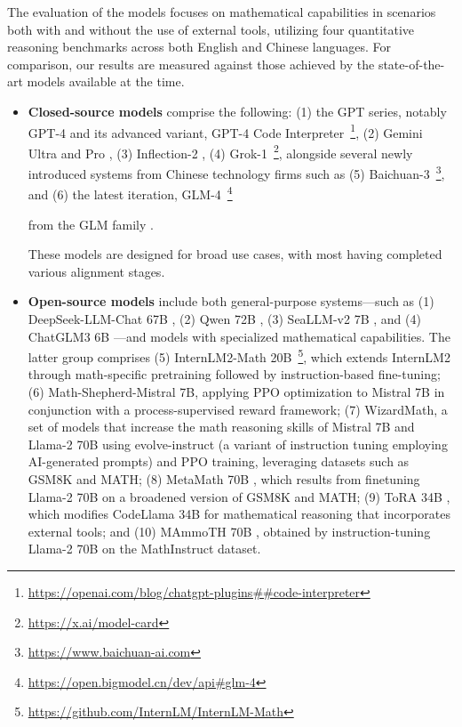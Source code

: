 \begin{itemize}[topsep=0pt]
The evaluation of the models focuses on mathematical capabilities in scenarios both with and without the use of external tools, utilizing four quantitative reasoning benchmarks across both English and Chinese languages. For comparison, our results are measured against those achieved by the state-of-the-art models available at the time.

\begin{itemize}[topsep=0pt]
    \item \textbf{Closed-source models} comprise the following: (1) the GPT series, notably GPT-4 \citep{gpt4} and its advanced variant, GPT-4 Code Interpreter~\footnote{\url{https://openai.com/blog/chatgpt-plugins\#\#code-interpreter}}, (2) Gemini Ultra and Pro \citep{gemini}, (3) Inflection-2 \citep{inflection-2}, (4) Grok-1~\footnote{\url{https://x.ai/model-card}}, alongside several newly introduced systems from Chinese technology firms such as (5) Baichuan-3~\footnote{\url{https://www.baichuan-ai.com}}, and (6) the latest iteration, GLM-4~\footnote{\url{https://open.bigmodel.cn/dev/api\#glm-4}}

    from the GLM family \citep{glm}.

These models are designed for broad use cases, with most having completed various alignment stages.

\item \textbf{Open-source models} include both general-purpose systems—such as (1) DeepSeek-LLM-Chat 67B \citep{deepseek-llm}, (2) Qwen 72B \citep{qwen}, (3) SeaLLM-v2 7B \citep{seallm}, and (4) ChatGLM3 6B \citep{chatglm3}—and models with specialized mathematical capabilities. The latter group comprises (5) InternLM2-Math 20B~\footnote{\url{https://github.com/InternLM/InternLM-Math}}, which extends InternLM2 through math-specific pretraining followed by instruction-based fine-tuning; (6) Math-Shepherd-Mistral 7B, applying PPO optimization \citep{schulman2017proximal} to Mistral 7B \citep{mistral} in conjunction with a process-supervised reward framework; (7) WizardMath, a set of models that increase the math reasoning skills of Mistral 7B and Llama-2 70B \citep{llama2} using evolve-instruct (a variant of instruction tuning employing AI-generated prompts) and PPO training, leveraging datasets such as GSM8K and MATH; (8) MetaMath 70B \citep{metamath}, which results from finetuning Llama-2 70B on a broadened version of GSM8K and MATH; (9) ToRA 34B \cite{tora}, which modifies CodeLlama 34B for mathematical reasoning that incorporates external tools; and (10) MAmmoTH 70B \citep{MathInstruct}, obtained by instruction-tuning Llama-2 70B on the MathInstruct dataset.
\end{itemize}


\end{itemize}
